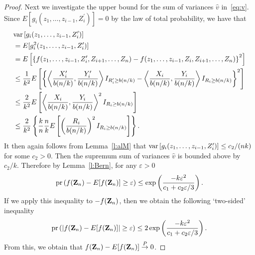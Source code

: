 \documentclass[lineno]{biometrika}
\newcommand \eg{\varepsilon}
\newcommand\bZ{{\bf Z}}
\newcommand\lp{\left (}
\newcommand\rp{\right )}
\newcommand\lb{\left [}
\newcommand\rb{\right ]}
\newcommand\lbr{\left \{}
\newcommand\rbr{\right \}}
\newcommand\lip{\left \langle}
\newcommand\rip{\right \rangle}
\def\convP{\stackrel{\mbox{$\scriptstyle P$}}{\rightarrow}}
\newcommand\var{\hbox{\rm var}}
\begin{document}
\begin{proof}
Next we investigate the upper bound for the sum of variances $\hat{v}$ in~\eqref{eq:v}. Since $E[g_i(z_1, \ldots, z_{i-1}, Z_i^{\prime})]=0$ by the law of total probability, we have that
\begin{align*}
&\var\lb g_i(z_1, \ldots, z_{i-1}, Z_i^{\prime})\rb \\
&= E [g_i^2(z_1, \ldots, z_{i-1}, Z_i^{\prime})]\\
&= E \lb \lbr  f(z_1, \ldots, z_{i-1},Z_i^{\prime}, Z_{i+1}, \ldots, Z_n)-f(z_1, \ldots, z_{i-1},Z_i, Z_{i+1}, \ldots, Z_n) \rbr^2 \rb \\
&\le \frac{1}{k^2} E\lb \lbr  \lip \frac{X_i^{\prime}}{b(n/k)}, \frac{Y_i^{\prime}}{b(n/k)} \rip I_{R_i^{\prime} \ge b(n/k) } - \lip \frac{X_i}{b(n/k)}, \frac{Y_i}{b(n/k)} \rip I_{R_i \ge b(n/k) }       \rbr^2 \rb \\
&\le \frac{2}{k^2} E \lb \lip \frac{X_i}{b(n/k)}, \frac{Y_i}{b(n/k)} \rip^2 I_{R_i \ge b(n/k) }   \rb \\
&\le \frac{2}{k^2} \lbr  \frac{k}{n} \frac{n}{k} E \lb  \lp \frac{R_i}{b(n/k)} \rp^2  I_{R_i \ge b(n/k) }  \rb \rbr.
\end{align*}
It then again follows from Lemma~\ref{l:alM} that $\var\lb g_i(z_1, \ldots, z_{i-1}, Z_i^{\prime})\rb  \le c_2/(nk)$ for some $c_2>0$. Then the supremum sum of variances $\hat{v}$ is bounded above by $c_2/k$. Therefore by Lemma~\ref{l:Bern}, for any $\eg>0$
\[
{\rm pr} \lp f(\bZ_n) - E[f(\bZ_n)]  \ge \eg \rp \le \exp \lp \frac{-k\eg^2}{c_1+c_2\eg/3} \rp.
\]
If we apply this inequality to $-f(\bZ_n)$, then we obtain the following `two-sided' inequality
\[
{\rm pr} \lp |f(\bZ_n) - E[f(\bZ_n)]|  \ge \eg \rp \le 2\exp \lp \frac{-k\eg^2}{c_1+c_2\eg/3} \rp.
\]
From this, we obtain that  $f(\bZ_n) - E[f(\bZ_n)] \convP 0$.


\end{proof}
\end{document}
